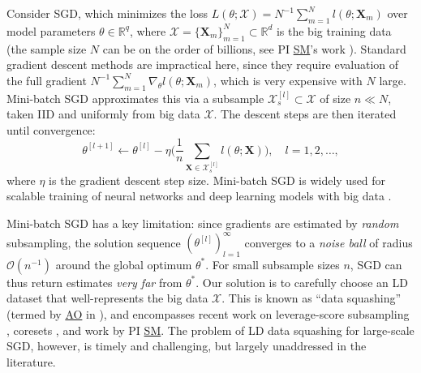 \documentclass[11pt]{NSFamsart}
\newcommand{\SM}{\hyperlink{SMlink}{SM}\xspace}
\newcommand{\AO}{\hyperlink{AOlink}{AO}\xspace}
\newcommand{\bX}{{\boldsymbol{X}}}
\begin{document}
\sloppypar Consider SGD, which minimizes the loss $L(\theta;\mathcal{X}) = N^{-1} \sum_{m=1}^N l(\theta;\bX_m)$ over model parameters $\theta \in \mathbb{R}^q$, where $\mathcal{X} = \{\bX_m\}_{m=1}^N \subset \mathbb{R}^d$ is the big training data (the sample size $N$ can be on the order of billions, see PI \SM's work \cite{mak2018efficient}). Standard gradient descent methods \cite{nocedal2006numerical} are impractical here, since they require evaluation of the full gradient $N^{-1} \sum_{m=1}^N \nabla_\theta l(\theta;\bX_m)$, which is very expensive with $N$ large. Mini-batch SGD \cite{Bot2010} approximates this via a subsample $\mathcal{X}_{s}^{[l]} \subset \mathcal{X}$ of size $n \ll N$, taken IID and uniformly from big data $\mathcal{X}$. The descent steps are then iterated until convergence:
\begin{equation}\label{eq:sgdopt}
\theta^{[l+1]} \leftarrow \theta^{[l]} - \eta \Biggl( \frac{1}{n} \sum_{\bX \in \mathcal{X}_{s}^{[l]}} l(\theta;\bX)\Biggr) , \quad l = 1, 2, \ldots,
\end{equation}
where $\eta$ is the gradient descent step size. Mini-batch SGD is widely used for scalable training of neural networks and deep learning models with big data \citep{srivastava2014dropout}.

Mini-batch SGD has a key limitation: since gradients are estimated by \textit{random} subsampling, the solution sequence $(\theta^{[l]})_{l=1}^\infty$ converges to a \textit{noise ball} of radius $\mathcal{O}(n^{-1})$ around the global optimum $\theta^*$. For small subsample sizes $n$, SGD can thus return estimates
\textit{very far} from  $\theta^*$. Our solution is to carefully choose an LD dataset that well-represents the big data $\mathcal{X}$. This is known as ``data squashing'' (termed by \AO in \cite{owen2003data}), and encompasses recent work on leverage-score subsampling \cite{ma2015statistical}, coresets \cite{chan2006faster,bachem2017practical, huggins2016coresets}, and work by PI \SM \cite{mak2018support,mak2018minimax,mak2017projected,krishna2019distributional}. The problem of LD data squashing for large-scale SGD, however, is timely and challenging, but largely unaddressed in the literature.
\end{document}
